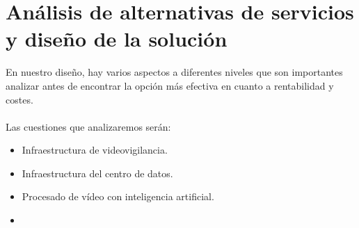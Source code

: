 \section{Análisis de alternativas de servicios y diseño de la solución}
En nuestro diseño, hay varios aspectos a diferentes niveles que son importantes analizar antes de 
encontrar la opción más efectiva en cuanto a rentabilidad y costes. 

\paragraph{}
Las cuestiones que analizaremos serán: 
\begin{itemize}
    \item Infraestructura de videovigilancia.
    \item Infraestructura del centro de datos.
    \item Procesado de vídeo con inteligencia artificial.
    \item 
\end{itemize}